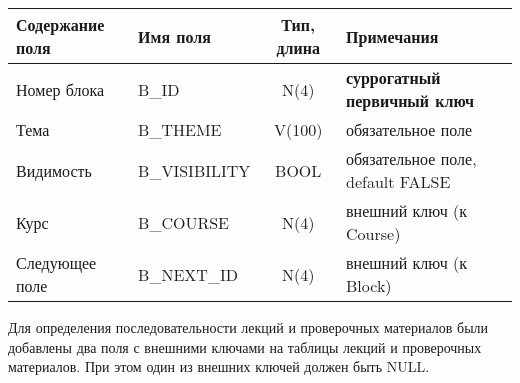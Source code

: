 \documentclass[a4paper,14pt]{article}
\begin{document}
\begin{table}[H]
	\begin{flushleft} 
	\end{flushleft}
	\begin{adjustbox}{width=\linewidth}
		\begin{tabular}{|l|l|c|l|}
			\hline
			Содержание поля & Имя поля      & Тип, длина & Примечания                          \\ \hline
			Номер блока     & B\_ID         &    N(4)    & \textbf{суррогатный первичный ключ} \\ \hline
			Тема            & B\_THEME      &   V(100)   & обязательное поле                   \\ \hline
			Видимость       & B\_VISIBILITY &    BOOL    & обязательное поле, default FALSE    \\ \hline
			Курс            & B\_COURSE     &    N(4)    & внешний ключ (к Course)             \\ \hline
			Следующее поле  & B\_NEXT\_ID   &    N(4)    & внешний ключ (к Block)              \\ \hline
		\end{tabular}
	\end{adjustbox}
\end{table}


Для определения последовательности лекций и проверочных материалов были добавлены два поля с внешними ключами на таблицы лекций и проверочных материалов.
При этом один из внешних ключей должен быть NULL.
\end{document}
